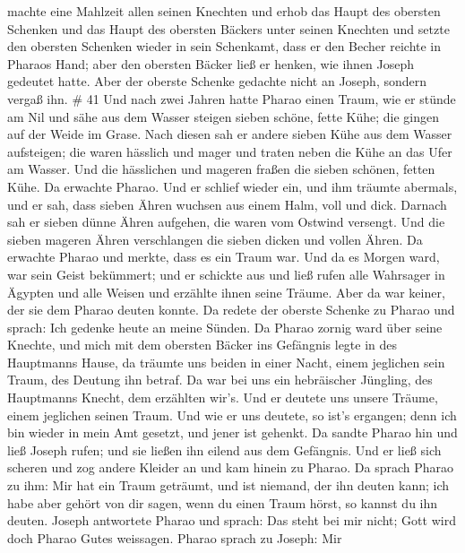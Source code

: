 machte eine Mahlzeit allen seinen Knechten und erhob das Haupt des
obersten Schenken und das Haupt des obersten Bäckers unter seinen
Knechten  und setzte den obersten Schenken wieder in sein
Schenkamt, dass er den Becher reichte in Pharaos Hand; 
aber den obersten Bäcker ließ er henken, wie ihnen Joseph gedeutet
hatte.  Aber der oberste Schenke gedachte nicht an Joseph,
sondern vergaß ihn. \# 41  Und nach zwei Jahren hatte Pharao
einen Traum, wie er stünde am Nil  und sähe aus dem Wasser
steigen sieben schöne, fette Kühe; die gingen auf der Weide im Grase.
 Nach diesen sah er andere sieben Kühe aus dem Wasser
aufsteigen; die waren hässlich und mager und traten neben die Kühe an
das Ufer am Wasser.  Und die hässlichen und mageren fraßen
die sieben schönen, fetten Kühe. Da erwachte Pharao.  Und er
schlief wieder ein, und ihm träumte abermals, und er sah, dass sieben
Ähren wuchsen aus einem Halm, voll und dick.  Darnach sah er
sieben dünne Ähren aufgehen, die waren vom Ostwind versengt.
 Und die sieben mageren Ähren verschlangen die sieben dicken
und vollen Ähren. Da erwachte Pharao und merkte, dass es ein Traum war.
 Und da es Morgen ward, war sein Geist bekümmert; und er
schickte aus und ließ rufen alle Wahrsager in Ägypten und alle Weisen
und erzählte ihnen seine Träume. Aber da war keiner, der sie dem Pharao
deuten konnte.  Da redete der oberste Schenke zu Pharao und
sprach: Ich gedenke heute an meine Sünden.  Da Pharao
zornig ward über seine Knechte, und mich mit dem obersten Bäcker ins
Gefängnis legte in des Hauptmanns Hause,  da träumte uns
beiden in einer Nacht, einem jeglichen sein Traum, des Deutung ihn
betraf.  Da war bei uns ein hebräischer Jüngling, des
Hauptmanns Knecht, dem erzählten wir's. Und er deutete uns unsere
Träume, einem jeglichen seinen Traum.  Und wie er uns
deutete, so ist's ergangen; denn ich bin wieder in mein Amt gesetzt, und
jener ist gehenkt.  Da sandte Pharao hin und ließ Joseph
rufen; und sie ließen ihn eilend aus dem Gefängnis. Und er ließ sich
scheren und zog andere Kleider an und kam hinein zu Pharao.
 Da sprach Pharao zu ihm: Mir hat ein Traum geträumt, und
ist niemand, der ihn deuten kann; ich habe aber gehört von dir sagen,
wenn du einen Traum hörst, so kannst du ihn deuten.  Joseph
antwortete Pharao und sprach: Das steht bei mir nicht; Gott wird doch
Pharao Gutes weissagen.  Pharao sprach zu Joseph: Mir
